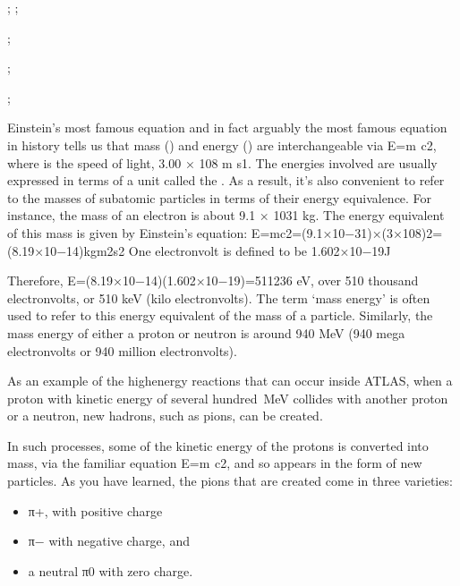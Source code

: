 \documentclass[letterpaper,10pt,english]{sphinxmanual}
\let\sphinxpxdimen\pdfpxdimen\else\newdimen\sphinxpxdimen
\begin{document}
 ; ;

 ;

 ;

 ;









\sphinxincludegraphics[width=512\sphinxpxdimen,height=288\sphinxpxdimen]{{sm123_2018b_vid101-640x360_openlearn}.jpg} Einstein’s most famous equation and in fact arguably the most famous equation in history tells us that mass () and energy () are interchangeable via E=m⁢  c2, where  is the speed of light, 3.00 × 108 m s\textendash{}1. The energies involved are usually expressed in terms of a unit called the . As a result, it’s also convenient to refer to the masses of subatomic particles in terms of their energy equivalence. For instance, the
mass of an electron is about 9.1 × 10\textendash{}31 kg. The energy equivalent of this mass is given by Einstein’s equation: E=mc2=(9.1×10−31)×(3×108)2=(8.19×10−14)kgm2s2 One electronvolt is defined to be 1.602×10−19J

Therefore, E=(8.19×10−14)(1.602×10−19)=511236 eV, over 510 thousand electronvolts, or 510 keV (kilo electronvolts). The term ‘mass energy’ is often used to refer to this energy equivalent of the mass of a particle. Similarly, the mass energy of either a proton or neutron is around 940 MeV (940 mega electronvolts or 940 million electronvolts).

As an example of the high\sphinxhyphen{}energy reactions that can occur inside ATLAS, when a proton with kinetic energy of several hundred MeV collides with another proton or a neutron, new hadrons, such as pions, can be created.

In such processes, some of the kinetic energy of the protons is converted into mass, via the familiar equation E=m⁢  c2, and so appears in the form of new particles. As you have learned, the pions that are created come in three varieties:
\begin{itemize}
\item {} 
π+, with positive charge

\item {} 
π− with negative charge, and

\item {} 
a neutral π0 with zero charge.

\end{itemize}
\end{document}
